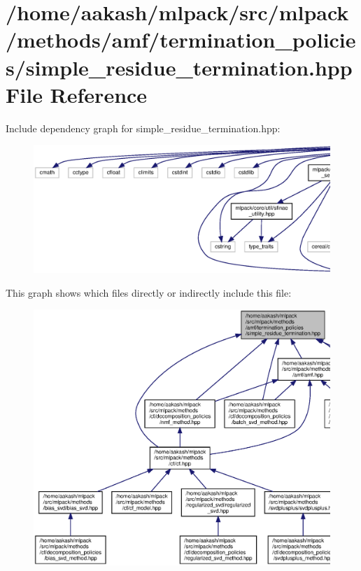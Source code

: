 \section{/home/aakash/mlpack/src/mlpack/methods/amf/termination\+\_\+policies/simple\+\_\+residue\+\_\+termination.hpp File Reference}
\label{simple__residue__termination_8hpp}
Include dependency graph for simple\+\_\+residue\+\_\+termination.\+hpp\+:
\nopagebreak
\begin{figure}[H]
\begin{center}
\leavevmode
\includegraphics[width=350pt]{simple__residue__termination_8hpp__incl}
\end{center}
\end{figure}
This graph shows which files directly or indirectly include this file\+:
\nopagebreak
\begin{figure}[H]
\begin{center}
\leavevmode
\includegraphics[width=350pt]{simple__residue__termination_8hpp__dep__incl}
\end{center}
\end{figure}
